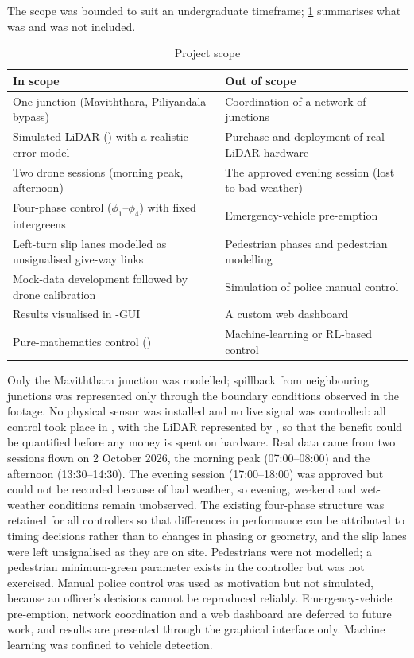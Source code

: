 The scope was bounded to suit an undergraduate timeframe; \cref{tab:intro-scope} summarises what was and was not included.

\begin{table}[htbp]
  \centering
  \caption{Project scope}
  \label{tab:intro-scope}
  \small
  \renewcommand{\arraystretch}{1.15}
  \begin{tabularx}{\textwidth}{@{}X X@{}}
    \toprule
    \textbf{In scope} & \textbf{Out of scope} \\
    \midrule
    One junction (Maviththara, Piliyandala bypass) & Coordination of a network of junctions \\
    Simulated LiDAR (\vls{}) with a realistic error model & Purchase and deployment of real LiDAR hardware \\
    Two drone sessions (morning peak, afternoon) & The approved evening session (lost to bad weather) \\
    Four-phase control ($\phi_1$--$\phi_4$) with fixed intergreens & Emergency-vehicle pre-emption \\
    Left-turn slip lanes modelled as unsignalised give-way links & Pedestrian phases and pedestrian modelling \\
    Mock-data development followed by drone calibration & Simulation of police manual control \\
    Results visualised in \sumo{}-GUI & A custom web dashboard \\
    Pure-mathematics control (\prism{}) & Machine-learning or RL-based control \\
    \bottomrule
  \end{tabularx}
\end{table}

Only the Maviththara junction was modelled; spillback from neighbouring junctions was represented only through the boundary conditions observed in the footage. No physical sensor was installed and no live signal was controlled: all control took place in \sumo{}, with the LiDAR represented by \vls{}, so that the benefit could be quantified before any money is spent on hardware. Real data came from two sessions flown on 2 October 2026, the morning peak (07:00--08:00) and the afternoon (13:30--14:30). The evening session (17:00--18:00) was approved but could not be recorded because of bad weather, so evening, weekend and wet-weather conditions remain unobserved. The existing four-phase structure was retained for all controllers so that differences in performance can be attributed to timing decisions rather than to changes in phasing or geometry, and the slip lanes were left unsignalised as they are on site. Pedestrians were not modelled; a pedestrian minimum-green parameter exists in the controller but was not exercised. Manual police control was used as motivation but not simulated, because an officer's decisions cannot be reproduced reliably. Emergency-vehicle pre-emption, network coordination and a web dashboard are deferred to future work, and results are presented through the \sumo{} graphical interface only. Machine learning was confined to vehicle detection.

